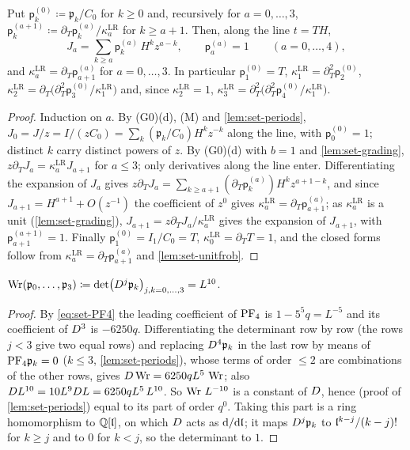 \begin{lem}
\label{lem:set-birkhoff}
Put $\mathsf p^{(0)}_k\coloneqq\mathfrak p_k/C_0$ for $k\geq0$ and, recursively for $a=0,\dots,3$, $\mathsf p^{(a+1)}_k\coloneqq\partial_T\mathsf p^{(a)}_k/\kappa^{\mathrm{LR}}_a$ for $k\geq a+1$. Then, along the line $t=TH$,
\[
J_a=\sum_{k\geq a}\mathsf p^{(a)}_k\,H^kz^{a-k},\qquad\mathsf p^{(a)}_a=1\qquad(a=0,\dots,4),
\]
and $\kappa^{\mathrm{LR}}_a=\partial_T\mathsf p^{(a)}_{a+1}$ for $a=0,\dots,3$. In particular $\mathsf p^{(0)}_1=T$, $\kappa^{\mathrm{LR}}_1=\partial_T^2\mathsf p^{(0)}_2$, $\kappa^{\mathrm{LR}}_2=\partial_T\bigl(\partial_T^2\mathsf p^{(0)}_3/\kappa^{\mathrm{LR}}_1\bigr)$ and, since $\kappa^{\mathrm{LR}}_2=1$, $\kappa^{\mathrm{LR}}_3=\partial_T^2\bigl(\partial_T^2\mathsf p^{(0)}_4/\kappa^{\mathrm{LR}}_1\bigr)$.
\end{lem}

\begin{proof}
Induction on $a$. By (G0)(d), (M) and \cref{lem:set-periods}, $J_0=J/z=I/(zC_0)=\sum_k(\mathfrak p_k/C_0)H^kz^{-k}$ along the line, with $\mathsf p^{(0)}_0=1$; distinct $k$ carry distinct powers of $z$. By (G0)(d) with $b=1$ and \cref{lem:set-grading}, $z\partial_TJ_a=\kappa^{\mathrm{LR}}_aJ_{a+1}$ for $a\leq3$; only derivatives along the line enter. Differentiating the expansion of $J_a$ gives $z\partial_TJ_a=\sum_{k\geq a+1}(\partial_T\mathsf p^{(a)}_k)H^kz^{a+1-k}$, and since $J_{a+1}=H^{a+1}+O(z^{-1})$ the coefficient of $z^0$ gives $\kappa^{\mathrm{LR}}_a=\partial_T\mathsf p^{(a)}_{a+1}$; as $\kappa^{\mathrm{LR}}_a$ is a unit (\cref{lem:set-grading}), $J_{a+1}=z\partial_TJ_a/\kappa^{\mathrm{LR}}_a$ gives the expansion of $J_{a+1}$, with $\mathsf p^{(a+1)}_{a+1}=1$. Finally $\mathsf p^{(0)}_1=I_1/C_0=T$, $\kappa^{\mathrm{LR}}_0=\partial_TT=1$, and the closed forms follow from $\kappa^{\mathrm{LR}}_a=\partial_T\mathsf p^{(a)}_{a+1}$ and \cref{lem:set-unitfrob}.
\end{proof}

\begin{lem}
\label{lem:set-wronskian}
$\operatorname{Wr}(\mathfrak p_0,\dots,\mathfrak p_3)\coloneqq\det\bigl(D^j\mathfrak p_k\bigr)_{j,k=0,\dots,3}=L^{10}$.
\end{lem}

\begin{proof}
By \eqref{eq:set-PF4} the leading coefficient of $\mathrm{PF}_{4}$ is $1-5^5q=L^{-5}$ and its coefficient of $D^3$ is $-6250q$. Differentiating the determinant row by row (the rows $j<3$ give two equal rows) and replacing $D^4\mathfrak p_k$ in the last row by means of $\mathrm{PF}_{4}\mathfrak p_k=0$ ($k\leq3$, \cref{lem:set-periods}), whose terms of order $\leq2$ are combinations of the other rows, gives $D\operatorname{Wr}=6250qL^5\,\operatorname{Wr}$; also $D L^{10}=10L^9D L=6250qL^5\,L^{10}$. So $\operatorname{Wr}\,L^{-10}$ is a constant of $D$, hence (proof of \cref{lem:set-periods}) equal to its part of order $q^0$. Taking this part is a ring homomorphism to $\mathbb{Q}[\mathfrak{l}]$, on which $D$ acts as $\mathrm{d}/\mathrm{d}\mathfrak{l}$; it maps $D^j\mathfrak p_k$ to $\mathfrak{l}^{k-j}/(k-j)!$ for $k\geq j$ and to $0$ for $k<j$, so the determinant to $1$.
\end{proof}

